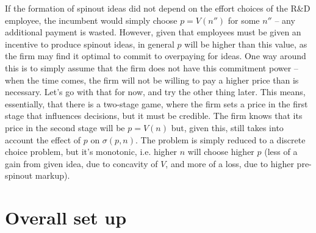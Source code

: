 \documentclass[12pt,english]{article}
\theoremstyle{remark}
\begin{document}
If the formation of spinout ideas did not depend on the effort choices of the R\&D employee, the incumbent would simply choose $p = V(n'')$ for some $n''$ -- any additional payment is wasted. However, given that employees must be given an incentive to produce spinout ideas, in general $p$ will be higher than this value, as the firm may find it optimal to commit to overpaying for ideas. One way around this is to simply assume that the firm does not have this commitment power -- when the time comes, the firm will not be willing to pay a higher price than is necessary. Let's go with that for now, and try the other thing later. This means, essentially, that there is a two-stage game, where the firm sets a price in the first stage that influences decisions, but it must be credible. The firm knows that its price in the second stage will be $p = V(n)$ but, given this, still takes into account the effect of $p$ on $\sigma(p,n)$. The problem is simply reduced to a discrete choice problem, but it's monotonic, i.e. higher $n$ will choose higher $p$ (less of a gain from given idea, due to concavity of $V$, and more of a loss, due to higher pre-spinout markup).

\section{Overall set up}
\end{document}
